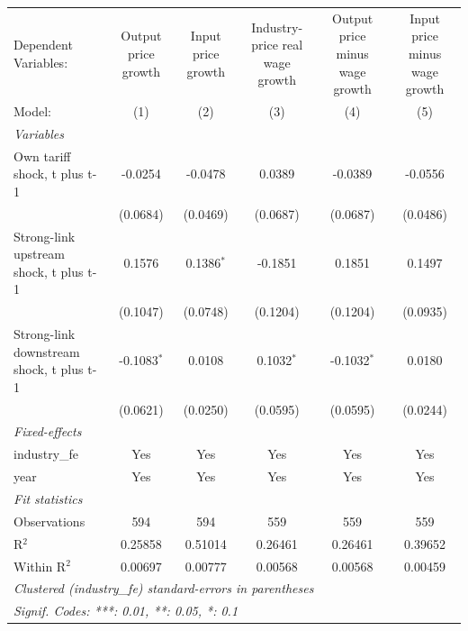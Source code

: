 \begingroup
\centering
\begin{tabular}{lccccc}
   \tabularnewline \midrule \midrule
   Dependent Variables:                     & Output price growth & Input price growth & Industry-price real wage growth & Output price minus wage growth & Input price minus wage growth\\  
   Model:                                   & (1)                 & (2)                & (3)                             & (4)                            & (5)\\  
   \midrule
   \emph{Variables}\\
   Own tariff shock, t plus t-1             & -0.0254             & -0.0478            & 0.0389                          & -0.0389                        & -0.0556\\   
                                            & (0.0684)            & (0.0469)           & (0.0687)                        & (0.0687)                       & (0.0486)\\   
   Strong-link upstream shock, t plus t-1   & 0.1576              & 0.1386$^{*}$       & -0.1851                         & 0.1851                         & 0.1497\\   
                                            & (0.1047)            & (0.0748)           & (0.1204)                        & (0.1204)                       & (0.0935)\\   
   Strong-link downstream shock, t plus t-1 & -0.1083$^{*}$       & 0.0108             & 0.1032$^{*}$                    & -0.1032$^{*}$                  & 0.0180\\   
                                            & (0.0621)            & (0.0250)           & (0.0595)                        & (0.0595)                       & (0.0244)\\   
   \midrule
   \emph{Fixed-effects}\\
   industry\_fe                             & Yes                 & Yes                & Yes                             & Yes                            & Yes\\  
   year                                     & Yes                 & Yes                & Yes                             & Yes                            & Yes\\  
   \midrule
   \emph{Fit statistics}\\
   Observations                             & 594                 & 594                & 559                             & 559                            & 559\\  
   R$^2$                                    & 0.25858             & 0.51014            & 0.26461                         & 0.26461                        & 0.39652\\  
   Within R$^2$                             & 0.00697             & 0.00777            & 0.00568                         & 0.00568                        & 0.00459\\  
   \midrule \midrule
   \multicolumn{6}{l}{\emph{Clustered (industry\_fe) standard-errors in parentheses}}\\
   \multicolumn{6}{l}{\emph{Signif. Codes: ***: 0.01, **: 0.05, *: 0.1}}\\
\end{tabular}
\par\endgroup
